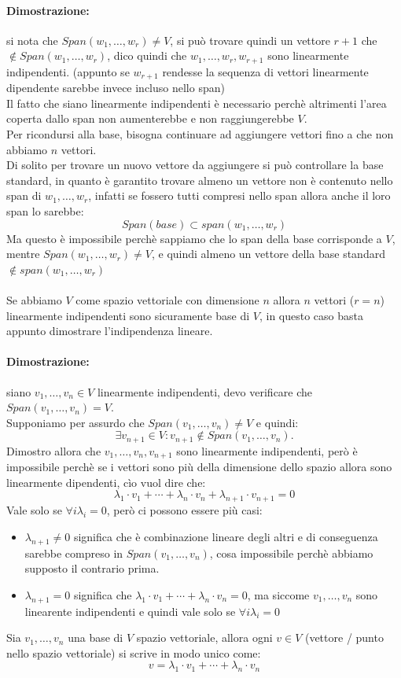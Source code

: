 \documentclass[12pt,a4paper]{article}
\begin{document}
\paragraph{Dimostrazione:} si nota che $Span(w_1,\ldots,w_r) \ne V$, si può trovare quindi un vettore $r+1$ che $\notin Span(w_1,\ldots,w_r)$, dico quindi che $w_1,\ldots,w_r,w_{r+1}$ sono linearmente indipendenti. (appunto se $w_{r+1}$ rendesse la sequenza di vettori linearmente dipendente sarebbe invece incluso nello span)\\
Il fatto che siano linearmente indipendenti è necessario perchè altrimenti l'area coperta dallo span non aumenterebbe e non raggiungerebbe $V$.\\
Per ricondursi alla base, bisogna continuare ad aggiungere vettori fino a che non abbiamo $n$ vettori.\\
Di solito per trovare un nuovo vettore da aggiungere si può controllare la base standard, in quanto è garantito trovare almeno un vettore non è contenuto nello span di $w_1,\ldots,w_r$, infatti se fossero tutti compresi nello span allora anche il loro span lo sarebbe:
\[
Span(base) \subset span(w_1,\ldots,w_r)
\] 
Ma questo è impossibile perchè sappiamo che lo span della base corrisponde a $V$, mentre $Span(w_1,\ldots,w_r) \ne V$, e quindi almeno un vettore della base standard $\notin span(w_1,\ldots,w_r)$\\\\
Se abbiamo $V$ come spazio vettoriale con dimensione $n$ allora $n$ vettori ($r = n$) linearmente indipendenti sono sicuramente base di $V$, in questo caso basta appunto dimostrare l'indipendenza lineare.
\paragraph{Dimostrazione:} siano $v_1,\ldots,v_n \in V$ linearmente indipendenti, devo verificare che $Span(v_1,\ldots,v_n) = V$.\\
Supponiamo per assurdo che $Span(v_1,\ldots,v_n) \ne V$ e quindi:
\[
\exists v_{n+1} \in V : v_{n+1} \notin Span(v_1,\ldots,v_n).
\]
Dimostro allora che $v_1,\ldots,v_n,v_{n+1}$ sono linearmente indipendenti, però è impossibile perchè se i vettori sono più della dimensione dello spazio allora sono linearmente dipendenti, cìo vuol dire che:
\[
\lambda_1 \cdot v_1 + \cdots + \lambda_n \cdot v_n + \lambda_{n+1} \cdot v_{n+1} = 0
\]
Vale solo se $\forall i \lambda_i = 0$, però ci possono essere più casi:
\begin{itemize}
  \item $\lambda_{n+1} \ne 0$ significa che è combinazione lineare degli altri e di conseguenza sarebbe compreso in $Span(v_1,\ldots,v_n)$, cosa impossibile perchè abbiamo supposto il contrario prima.
  \item $\lambda_{n+1} = 0$ significa che $\lambda_1 \cdot v_1 + \cdots + \lambda_n \cdot v_n = 0$, ma siccome $v_1,\ldots,v_n$ sono linearente indipendenti e quindi vale solo se $\forall i \lambda_i = 0$
\end{itemize}
Sia $v_1,\ldots,v_n$ una base di $V$ spazio vettoriale, allora ogni $v \in V$ (vettore / punto nello spazio vettoriale) si scrive in modo unico come:
\[
v = \lambda_1 \cdot v_1 + \cdots + \lambda_n \cdot v_n
\]
\end{document}
